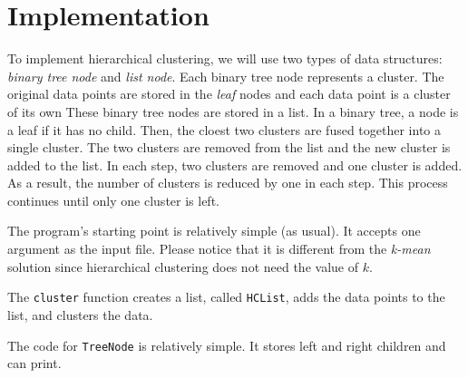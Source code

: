\section{Implementation}


To implement hierarchical clustering, we will use two types of data
structures: {\it binary tree node} and {\it list node}.  Each binary
tree node represents a cluster. The original data points are stored in
the {\it leaf} nodes and each data point is a cluster of its own These
binary tree nodes are stored in a list.  In a binary tree, a node is a
leaf if it has no child.  Then, the cloest two clusters are fused
together into a single cluster.  The two clusters are removed from the
list and the new cluster is added to the list.  In each step, two
clusters are removed and one cluster is added.  As a result, the
number of clusters is reduced by one in each step.  This process
continues until only one cluster is left.

The program's starting point is relatively simple (as usual).  It
accepts one argument as the input file. Please notice that it is
different from the {\it k-mean} solution since hierarchical clustering
does not need the value of $k$.

\resetlinenumber[1]
\linenumbers
\begin{tt}
  
\end{tt}
\nolinenumbers

The {\tt cluster} function creates a list, called {\tt HCList}, adds
the data points to the list, and clusters the data.

\resetlinenumber[1]
\linenumbers
\begin{tt}
  
\end{tt}
\nolinenumbers

The code for {\tt TreeNode} is relatively simple. It stores
left and right children and can print.

\resetlinenumber[1]
\linenumbers
\begin{tt}
  
\end{tt}
\nolinenumbers


